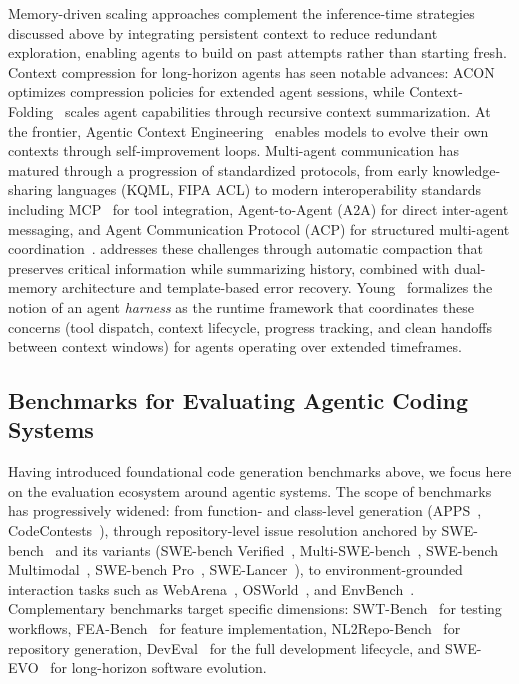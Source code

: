 Memory-driven scaling approaches complement the inference-time strategies discussed above by integrating persistent context to reduce redundant exploration, enabling agents to build on past attempts rather than starting fresh. Context compression for long-horizon agents has seen notable advances: ACON~\cite{kang2025acon} optimizes compression policies for extended agent sessions, while Context-Folding~\cite{sun2025scaling} scales agent capabilities through recursive context summarization. At the frontier, Agentic Context Engineering~\cite{zhang2025agentic} enables models to evolve their own contexts through self-improvement loops. Multi-agent communication has matured through a progression of standardized protocols, from early knowledge-sharing languages (KQML, FIPA ACL) to modern interoperability standards including MCP~\cite{anthropic2024mcp} for tool integration, Agent-to-Agent (A2A) for direct inter-agent messaging, and Agent Communication Protocol (ACP) for structured multi-agent coordination~\cite{mei2025survey}. \name addresses these challenges through automatic compaction that preserves critical information while summarizing history, combined with dual-memory architecture and template-based error recovery. Young~\cite{anthropic2025harness} formalizes the notion of an agent \emph{harness} as the runtime framework that coordinates these concerns (tool dispatch, context lifecycle, progress tracking, and clean handoffs between context windows) for agents operating over extended timeframes.

\subsection{Benchmarks for Evaluating Agentic Coding Systems}

Having introduced foundational code generation benchmarks above, we focus here on the evaluation ecosystem around agentic systems. The scope of benchmarks has progressively widened: from function- and class-level generation (APPS~\cite{apps}, CodeContests~\cite{codecontests}), through repository-level issue resolution anchored by SWE-bench~\cite{jimenez2024swebenchlanguagemodelsresolve} and its variants (SWE-bench Verified~\cite{swebench_verified}, Multi-SWE-bench~\cite{multi_swebench}, SWE-bench Multimodal~\cite{yang2024swebenchmultimodalaisystems}, SWE-bench Pro~\cite{Deng2025SWEBenchPC}, SWE-Lancer~\cite{SWELancer}), to environment-grounded interaction tasks such as WebArena~\cite{zhouWebArenaRealisticWeb2024}, OSWorld~\cite{xieOSWorldBenchmarkingMultimodal2024}, and EnvBench~\cite{eliseevaEnvBenchBenchmarkAutomated2025}. Complementary benchmarks target specific dimensions: SWT-Bench~\cite{SWTBench} for testing workflows, FEA-Bench~\cite{fea_bench} for feature implementation, NL2Repo-Bench~\cite{nl2repo_bench} for repository generation, DevEval~\cite{DevEval} for the full development lifecycle, and SWE-EVO~\cite{thai2025swe} for long-horizon software evolution.

